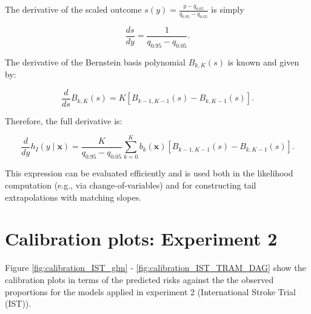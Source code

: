 The derivative of the scaled outcome \( s(y) = \frac{y - q_{0.05}}{q_{0.95} - q_{0.05}} \) is simply

\begin{equation}
\frac{ds}{dy} = \frac{1}{q_{0.95} - q_{0.05}}.
\end{equation}

The derivative of the Bernstein basis polynomial \( B_{k,K}(s) \) is known and given by:

\begin{equation}
\frac{d}{ds} B_{k,K}(s) = K \left[ B_{k-1,K-1}(s) - B_{k,K-1}(s) \right].
\end{equation}

Therefore, the full derivative is:

\begin{equation}
\frac{d}{dy} h_I(y \mid \mathbf{x}) = \frac{K}{q_{0.95} - q_{0.05}} \sum_{k=0}^{K} b_k(\mathbf{x}) \left[ B_{k-1,K-1}(s) - B_{k,K-1}(s) \right].
\end{equation}

This expression can be evaluated efficiently and is used both in the likelihood computation (e.g., via change-of-variables) and for constructing tail extrapolations with matching slopes.




\section{Calibration plots: Experiment 2} \label{sec:calibrations_experiment2}

Figure \ref{fig:calibration_IST_glm} - \ref{fig:calibration_IST_TRAM_DAG} show the calibration plots in terms of the predicted risks against the the observed proportions for the models applied in experiment 2 (International Stroke Trial (IST)). 

